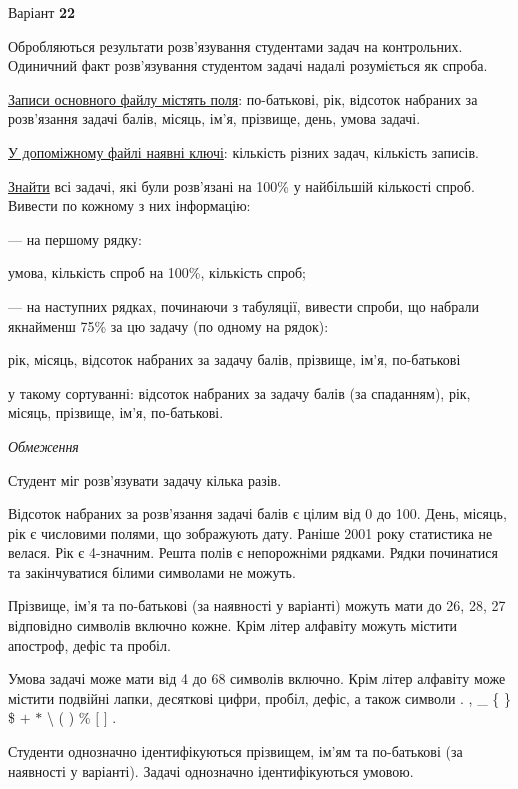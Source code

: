 \documentclass[11pt, ukrainian]{article}
\begin{document}
\par
\newpage
{\center Варіант  \No \textbf { 22 }\par}
\bigskip
Обробляються результати розв’язування студентами задач на контрольних.
Одиничний факт роз\-в’я\-зу\-вання студентом задачі надалі розуміється як спроба.

\underline{Записи основного файлу містять поля}: по-батькові, рік, відсоток набраних за розв’язання задачі балів, місяць, ім’я, прізвище, день, умова задачі.

\underline{У допоміжному файлі наявні ключі}: кількість різних задач, кількість записів.

\underline{Знайти} всі задачі, які були розв’язані на 100\% у найбільшій кількості спроб. Вивести по кожному з них інформацію:\par
{\noindent}--- на першому рядку:\par
умова, кількість спроб на 100\%, кількість спроб;

{\noindent}--- на наступних рядках, починаючи з табуляції, вивести спроби, що набрали якнайменш 75\% за цю задачу (по одному на рядок):\par
рік, місяць, відсоток набраних за задачу балів, прізвище, ім’я, по-батькові

{\noindent}у такому сортуванні: відсоток набраних за задачу балів (за спаданням), рік, місяць, прізвище, ім’я, по-батькові.


\bigskip\textit{Обмеження}

Студент міг розв’язувати задачу кілька разів.

Відсоток набраних за розв’язання задачі балів є цілим від 0 до 100.
День, місяць, рік є числовими полями, що зображують дату.
Раніше 2001 року статистика не велася. Рік є 4-значним.
Решта полів є непорожніми рядками.
Рядки починатися та закінчуватися білими символами не можуть.

Прізвище, ім’я та по-батькові (за наявності у варіанті) можуть мати до 26, 28, 27 відповідно символів включно кожне. 
Крім літер алфавіту можуть містити апостроф, дефіс та пробіл.

Умова задачі може мати від 4 до 68 символів включно.
Крім літер алфавіту може містити подвійні лапки, десяткові цифри, пробіл, дефіс,
а також символи . , \_ \{ \} \$ $+$ $*$ {\textbackslash} ( ) \% $[$ $]$ .

Студенти однозначно ідентифікуються прізвищем, ім’ям та по-батькові (за наявності у варіанті).
Задачі однозначно ідентифікуються умовою.
\end{document}

